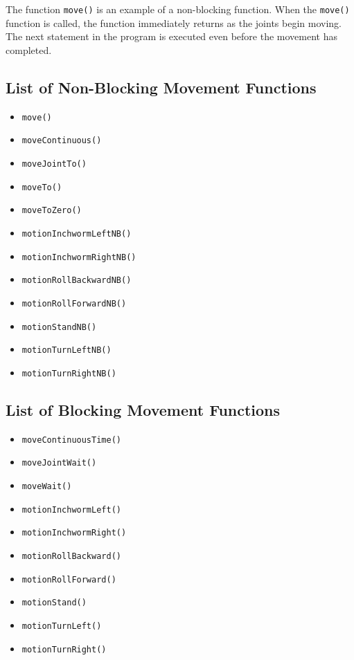 \documentclass{article}
\begin{document}
The function \texttt{move()} is an example of a non-blocking function. When
the \texttt{move()} function is called, the function immediately returns 
as the joints begin moving. The next statement in the program is executed
even before the movement has completed. 

\subsection{List of Non-Blocking Movement Functions}
\begin{itemize}
\item \texttt{move()}
\item \texttt{moveContinuous()}
\item \texttt{moveJointTo()}
\item \texttt{moveTo()}
\item \texttt{moveToZero()}
\item \texttt{motionInchwormLeftNB()}
\item \texttt{motionInchwormRightNB()}
\item \texttt{motionRollBackwardNB()}
\item \texttt{motionRollForwardNB()}
\item \texttt{motionStandNB()}
\item \texttt{motionTurnLeftNB()}
\item \texttt{motionTurnRightNB()}
\end{itemize}

\subsection{List of Blocking Movement Functions}
\begin{itemize}
\item \texttt{moveContinuousTime()}
\item \texttt{moveJointWait()}
\item \texttt{moveWait()}
\item \texttt{motionInchwormLeft()}
\item \texttt{motionInchwormRight()}
\item \texttt{motionRollBackward()}
\item \texttt{motionRollForward()}
\item \texttt{motionStand()}
\item \texttt{motionTurnLeft()}
\item \texttt{motionTurnRight()}
\end{itemize}
\end{document}
